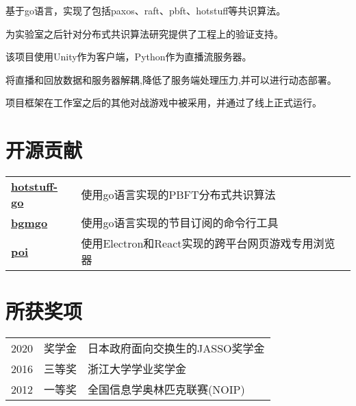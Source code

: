 \documentclass[]{deedy-resume-openfont}
\begin{document}
\begin{minipage}[t]{0.74\textwidth}
\begin{tightemize}
    \item 基于go语言，实现了包括paxos、raft、pbft、hotstuff等共识算法。
    \item 为实验室之后针对分布式共识算法研究提供了工程上的验证支持。
    \end{tightemize}
\sectionsep

\begin{tightemize}
    \item 该项目使用Unity作为客户端，Python作为直播流服务器。
    \item 将直播和回放数据和服务器解耦,降低了服务端处理压力,并可以进行动态部署。
    \item 项目框架在工作室之后的其他对战游戏中被采用，并通过了线上正式运行。
    \end{tightemize}
\sectionsep



\section{开源贡献}

\begin{tabular}{ll}
\href{https://github.com/myzWILLmake/pbft-go}{\bf hotstuff-go} & 使用go语言实现的PBFT分布式共识算法 \\
\href{https://github.com/myzWILLmake/bgmgo}{\bf bgmgo} & 使用go语言实现的节目订阅的命令行工具 \\
\href{https://github.com/poooi/poi}{\bf poi} & 使用Electron和React实现的跨平台网页游戏专用浏览器 \\
\end{tabular}
\sectionsep


\section{所获奖项}

\begin{tabular}{rll}
2020      & 奖学金 & 日本政府面向交换生的JASSO奖学金 \\
2016	     & 三等奖  & 浙江大学学业奖学金 \\
2012	     & 一等奖  & 全国信息学奥林匹克联赛(NOIP)\\
\end{tabular}
\sectionsep



\end{minipage}
\end{document}
